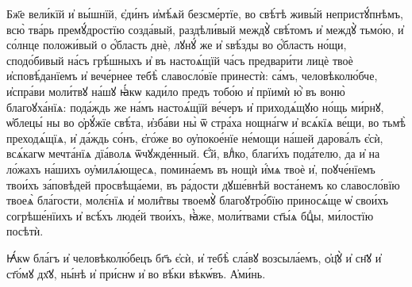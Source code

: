 \documentclass{article}          %
\makeatletter
\def\cu@lettrine{\lettrine[lines=2,nindent=0pt,loversize=-0.15]}
\def\cuLettrine{\cu@tokenizeletter\cu@lettrine}
\newcommand{\header}[1]{{\Large\centering\cuKinovar{#1}\par}\nopagebreak} %
\makeatother
\begin{document}
\header{Моли́тва \cuNum{7}}
\cuLettrine
Бж҃е вели́кїй и҆ вы́шнїй, є҆ди́нъ и҆мѣ́ѧй безсме́ртїе, во свѣ́тѣ живы́й непристꙋ́пнѣмъ, всю̀ тва́рь премꙋ́дростїю созда́вый, раздѣли́вый междꙋ̀ свѣ́томъ и҆ междꙋ̀ тьмо́ю, и҆ со́лнце положи́вый о ѻ҆́бласть днѐ, лꙋнꙋ́ же и҆ ѕвѣ́зды во ѻ҆́бласть но́щи, сподо́бивый на́съ грѣ́шныхъ и҆ въ настоѧ́щїй ча́съ предвари́ти лицѐ твоѐ и҆сповѣ́данїемъ и҆ вече́рнее тебѣ̀ славосло́вїе принестѝ: са́мъ, человѣколю́бче, и҆спра́ви моли́твꙋ на́шꙋ ꙗ҆́кѡ кади́ло предъ тобо́ю и҆ прїимѝ ю҆̀ въ воню̀ благоꙋха́нїѧ: пода́ждь же на́мъ настоѧ́щїй ве́черъ и҆ приходѧ́щꙋю но́щь ми́рнꙋ, ѡ҆блецы́ ны во ѻ҆рꙋ́жїе свѣ́та, и҆зба́ви ны̀ ѿ стра́ха нощна́гѡ и҆ всѧ́кїѧ ве́щи, во тьмѣ̀ преходѧ́щїѧ, и҆ да́ждь со́нъ, є҆го́же во оу҆покое́нїе не́мощи на́шей дарова́лъ є҆сѝ, всѧ́кагѡ мечта́нїѧ дїа́волѧ ѿчꙋжде́нный. Є҆́й, влⷣко, благи́хъ пода́телю, да и҆ на ло́жахъ на́шихъ оу҆милѧ́ющесѧ, помина́емъ въ нощѝ и҆́мѧ твоѐ и҆, поꙋче́нїемъ твои́хъ за́повѣдей просвѣща́еми, въ ра́дости дꙋше́внѣй воста́немъ ко славосло́вїю твоеѧ̀ бла́гости, молє́нїѧ и҆ моли̑твы твоемꙋ̀ благоꙋтро́бїю приносѧ́ще ѡ҆ свои́хъ согрѣше́нїихъ и҆ всѣ́хъ люде́й твои́хъ, ꙗ҆̀же, моли́твами ст҃ы́ѧ бцⷣы, ми́лостїю посѣтѝ.
\par
\cuKinovar Ꙗ҆́кѡ бла́гъ и҆ человѣколю́бецъ бг҃ъ є҆сѝ, и҆ тебѣ̀ сла́вꙋ возсыла́емъ, ѻ҆ц҃ꙋ̀ и҆ сн҃ꙋ и҆ ст҃о́мꙋ дх҃ꙋ, ны́нѣ и҆ при́снѡ и҆ во вѣ́ки вѣкѡ́въ.
\cuKinovar А҆ми́нь.
\end{document}
